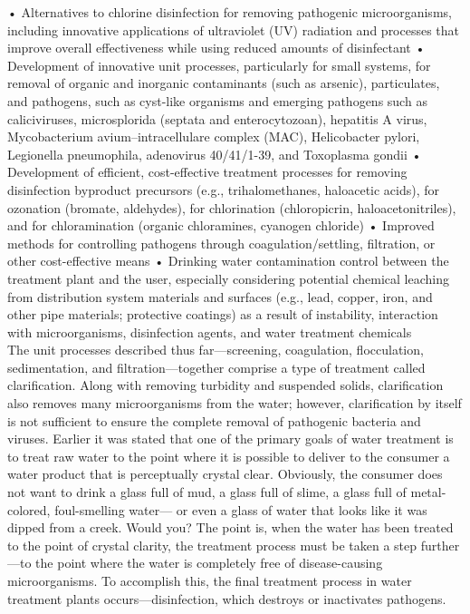 \documentclass{article}
\begin{document}
• Alternatives to chlorine disinfection for removing pathogenic
microorganisms, including innovative applications of ultraviolet (UV)
radiation and processes that improve overall effectiveness while using
reduced amounts of disinfectant • Development of innovative unit
processes, particularly for small systems, for removal of organic and
inorganic contaminants (such as arsenic), particulates, and pathogens,
such as cyst-like organisms and emerging pathogens such as
caliciviruses, microsplorida (septata and enterocytozoan), hepatitis A
virus, Mycobacterium avium--intracellulare complex (MAC), Helicobacter
pylori, Legionella pneumophila, adenovirus 40/41/1-39, and Toxoplasma
gondii • Development of efficient, cost-effective treatment processes
for removing disinfection byproduct precursors (e.g., trihalomethanes,
haloacetic acids), for ozonation (bromate, aldehydes), for chlorination
(chloropicrin, haloacetonitriles), and for chloramination (organic
chloramines, cyanogen chloride) • Improved methods for controlling
pathogens through coagulation/settling, filtration, or other
cost-effective means • Drinking water contamination control between the
treatment plant and the user, especially considering potential chemical
leaching from distribution system materials and surfaces (e.g., lead,
copper, iron, and other pipe materials; protective coatings) as a result
of instability, interaction with microorganisms, disinfection agents,
and water treatment chemicals\\
The unit processes described thus far---screening, coagulation,
flocculation, sedimentation, and filtration---together comprise a type
of treatment called clarification. Along with removing turbidity and
suspended solids, clarification also removes many microorganisms from
the water; however, clarification by itself is not sufficient to ensure
the complete removal of pathogenic bacteria and viruses. Earlier it was
stated that one of the primary goals of water treatment is to treat raw
water to the point where it is possible to deliver to the consumer a
water product that is perceptually crystal clear. Obviously, the
consumer does not want to drink a glass full of mud, a glass full of
slime, a glass full of metal-colored, foul-smelling water--- or even a
glass of water that looks like it was dipped from a creek. Would you?
The point is, when the water has been treated to the point of crystal
clarity, the treatment process must be taken a step further---to the
point where the water is completely free of disease-causing
microorganisms. To accomplish this, the final treatment process in water
treatment plants occurs---disinfection, which destroys or inactivates
pathogens.
\end{document}
